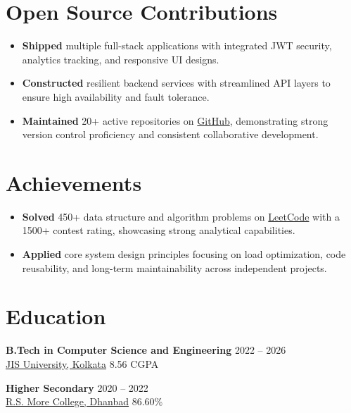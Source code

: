 \documentclass[a4paper,10pt]{article}
\begin{document}
\section*{Open Source Contributions}
\begin{itemize}
\item \textbf{Shipped} multiple full-stack applications with integrated JWT security, analytics tracking, and responsive UI designs.
\item \textbf{Constructed} resilient backend services with streamlined API layers to ensure high availability and fault tolerance.
\item \textbf{Maintained} 20+ active repositories on \href{https://github.com/Saheb142003}{GitHub}, demonstrating strong version control proficiency and consistent collaborative development.
\end{itemize}

\section*{Achievements}
\begin{itemize}
\item \textbf{Solved} 450+ data structure and algorithm problems on \href{https://leetcode.com/u/saheb142003/}{LeetCode} with a 1500+ contest rating, showcasing strong analytical capabilities.
\item \textbf{Applied} core system design principles focusing on load optimization, code reusability, and long-term maintainability across independent projects.
\end{itemize}

\section*{Education}
\textbf{B.Tech in Computer Science and Engineering} \hfill 2022 -- 2026 \\
\href{https://jisuniversity.ac.in}{JIS University, Kolkata} \hfill 8.56 CGPA \vspace{3pt}

\textbf{Higher Secondary} \hfill 2020 -- 2022 \\
\href{https://drive.google.com/file/d/1NXPlnSnuPSRjS4P6Tt3J7UAzP7Mf2cbm/view?usp=sharing}{R.S. More College, Dhanbad} \hfill 86.60\% \vspace{3pt}
\end{document}
